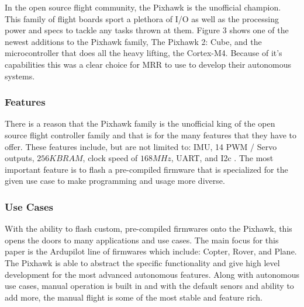 \documentclass[conference,12pt, ]{IEEEtran}
\begin{document}
In the open source flight community, the Pixhawk is the unofficial champion. This family of flight boards sport a plethora of I/O as well as the processing power and specs to tackle any tasks thrown at them. Figure 3 shows one of the newest additions to the Pixhawk family, The Pixhawk 2: Cube, and the microcontroller that does all the heavy lifting, the Cortex-M4. Because of it's capabilities this was a clear choice for MRR to use to develop their autonomous systems. 

\subsubsection{Features}
There is a reason that the Pixhawk family is the unofficial king of the open source flight controller family and that is for the many features that they have to offer. These features include, but are not limited to: IMU, 14 PWM / Servo outputs, $256 KB RAM$, clock speed of $168 MHz$, UART, and I2c \cite{pixhawk_cube}. The most important feature is to flash a pre-compiled firmware that is specialized for the given use case to make programming and usage more diverse.

\subsubsection{Use Cases}
With the ability to flash custom, pre-compiled firmwares onto the Pixhawk, this opens the doors to many applications and use cases. The main focus for this paper is the Ardupilot line of firmwares which include: Copter, Rover, and Plane. The Pixhawk is able to abstract the specific functionality and give high level development for the most advanced autonomous features. Along with autonomous use cases, manual operation is built in and with the default senors and ability to add more, the manual flight is some of the most stable and feature rich.
\end{document}
